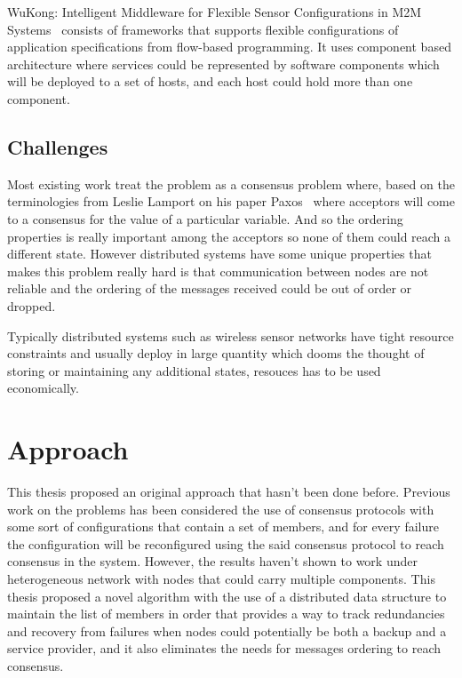 WuKong: Intelligent Middleware for Flexible Sensor Configurations in M2M
Systems~\cite{Reijers} consists of frameworks that supports flexible
configurations of application specifications from flow-based programming.
It uses component based architecture where services could be represented by
software components which will be deployed to a set of hosts, and each host
could hold more than one component.

\subsection{Challenges}

Most existing work treat the problem as a consensus problem where, based on the
terminologies from Leslie Lamport on his paper Paxos~\cite{Lamport2001}
where acceptors will come to a consensus for the value of a particular
variable. And so the ordering properties is really important among the
acceptors so none of them could reach a different state. However distributed
systems have some unique properties that makes this problem really hard is that
communication between nodes are not reliable and the ordering of the messages
received could be out of order or dropped.

Typically distributed systems such as wireless sensor networks have tight
resource constraints and usually deploy in large quantity which
dooms the thought of storing or maintaining any additional states, resouces has
to be used economically.

\section{Approach}

This thesis proposed an original approach that hasn't been done before.
Previous work on the problems has been considered the use of consensus
protocols with some sort of configurations that contain a set of members, and
for every failure the configuration will be reconfigured using the said
consensus protocol to reach consensus in the system. However, the results
haven't shown to work under heterogeneous network with nodes that could carry
multiple components. This thesis proposed a novel algorithm with the use of
a distributed data structure to maintain the list of members in order that
provides a way to track redundancies and recovery from failures when nodes
could potentially be both a backup and a service provider, and it also
eliminates the needs for messages ordering to reach consensus.

